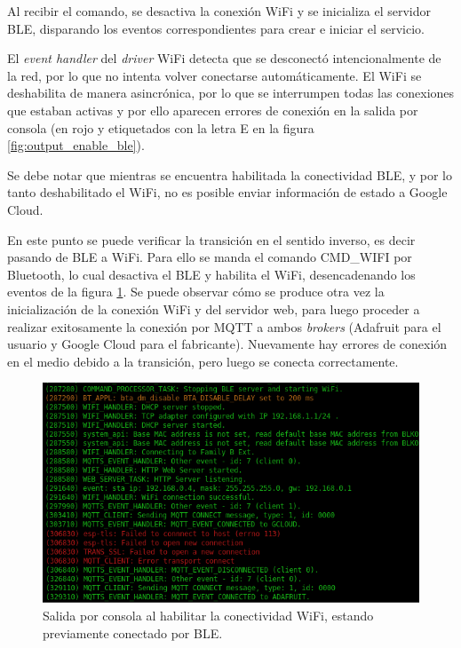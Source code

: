 Al recibir el comando, se desactiva la conexión WiFi y se inicializa el servidor BLE, disparando los eventos correspondientes para crear e iniciar el servicio.

El \emph{event handler} del \emph{driver} WiFi detecta que se desconectó intencionalmente de la red, por lo que no intenta volver conectarse automáticamente. El WiFi se deshabilita de manera asincrónica, por lo que se interrumpen todas las conexiones que estaban activas y por ello aparecen errores de conexión en la salida por consola (en rojo y etiquetados con la letra E en la figura \ref{fig:output_enable_ble}).

Se debe notar que mientras se encuentra habilitada la conectividad BLE, y por lo tanto deshabilitado el WiFi, no es posible enviar información de estado a Google Cloud.

En este punto se puede verificar la transición en el sentido inverso, es decir pasando de BLE a WiFi. Para ello se manda el comando CMD\_WIFI por Bluetooth, lo cual desactiva el BLE y habilita el WiFi, desencadenando los eventos de la figura \ref{fig:output_enable_wifi}. Se puede observar cómo se produce otra vez la inicialización de la conexión WiFi y del servidor web, para luego proceder a realizar exitosamente la conexión por MQTT a ambos \emph{brokers} (Adafruit para el usuario y Google Cloud para el fabricante). Nuevamente hay errores de conexión en el medio debido a la transición, pero luego se conecta correctamente.

\begin{figure}[h]
\centering
\includegraphics[width=\textwidth]{./Figures/output_enable_wifi.png}
\caption{Salida por consola al habilitar la conectividad WiFi, estando previamente conectado por BLE.}
\label{fig:output_enable_wifi}
\end{figure}

